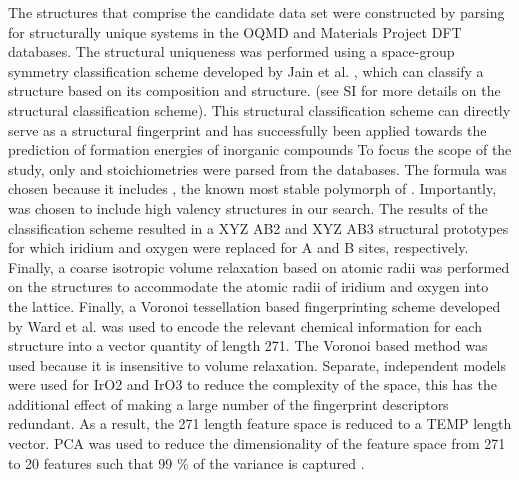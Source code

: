 

The structures that comprise the candidate data set were constructed by parsing for structurally unique systems in the OQMD and Materials Project DFT databases.
%
The structural uniqueness was performed using a space-group symmetry classification scheme developed by Jain et al. \cite{Jain2018},
which can classify a structure based on its composition and structure.
 (see SI for more details on the structural classification scheme).
%
This structural classification scheme can directly serve as a structural fingerprint and has successfully been applied towards the prediction of formation energies of inorganic compounds \cite{Jain2018}
%
To focus the scope of the study, only \ABtwo  and \ABthree stoichiometries were parsed from the databases.
%
The \ABtwo formula was chosen because it includes \rIrOtwo, the known most stable polymorph of \IrOtwo.
%
Importantly, \ABthree was chosen to include high valency \IrOthree structures in our search.
%
The results of the classification scheme resulted in a XYZ AB2 and XYZ AB3 structural prototypes for which iridium and oxygen were replaced for A and B sites, respectively.
%
Finally, a coarse isotropic volume relaxation based on atomic radii was performed on the structures to accommodate the atomic radii of iridium and oxygen into the lattice.
%
Finally, a Voronoi tessellation based fingerprinting scheme developed by Ward et al. \cite{Ward2017} was used to encode the relevant chemical information for each structure into a vector quantity of length 271.
%
The Voronoi based method was used because it is insensitive to volume relaxation.
%
Separate, independent models were used for IrO2 and IrO3 to reduce the complexity of the space, this has the additional effect of making a large number of the fingerprint descriptors redundant.
As a result, the 271 length feature space is reduced to a TEMP length vector.
%
PCA was used to reduce the dimensionality of the feature space from 271 to 20 features such that 99 \% of the variance is captured \cite{Tipping1999}.


